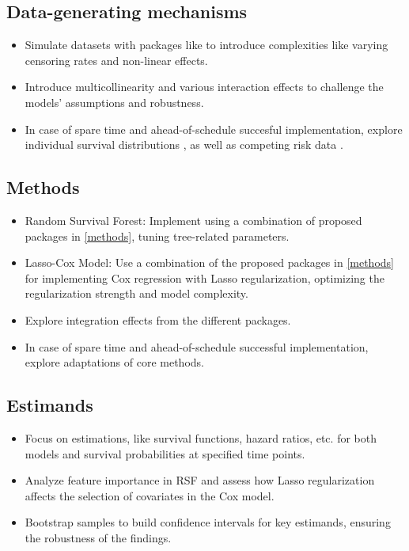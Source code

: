 \subsection{Data-generating mechanisms}
\begin{itemize}
\item Simulate datasets with packages like \parencite{davidson-pilon_lifelines_2024} to introduce complexities like varying censoring rates and non-linear effects.
\item Introduce multicollinearity and various interaction effects to challenge the models' assumptions and robustness.
\item In case of spare time and ahead-of-schedule succesful implementation, explore individual survival distributions \parencite{haider_effective_2018}, as well as competing risk data \parencite{meng_simulating_2023}.
\end{itemize}

\subsection{Methods}
\begin{itemize}
\item Random Survival Forest: Implement using a combination of proposed packages in \ref{methods}, tuning tree-related parameters.
\item Lasso-Cox Model: Use a combination of the proposed packages in \ref{methods} for implementing Cox regression with Lasso regularization, optimizing the regularization strength and model complexity. 
\item Explore integration effects from the different packages.
\item In case of spare time and ahead-of-schedule successful implementation, explore adaptations of core methods.
\end{itemize}

\subsection{Estimands}
\begin{itemize}
\item Focus on estimations, like survival functions, hazard ratios, etc. for both models and survival probabilities at specified time points.
\item Analyze feature importance in RSF and assess how Lasso regularization affects the selection of covariates in the Cox model.
\item Bootstrap samples to build confidence intervals for key estimands, ensuring the robustness of the findings.
\end{itemize}

